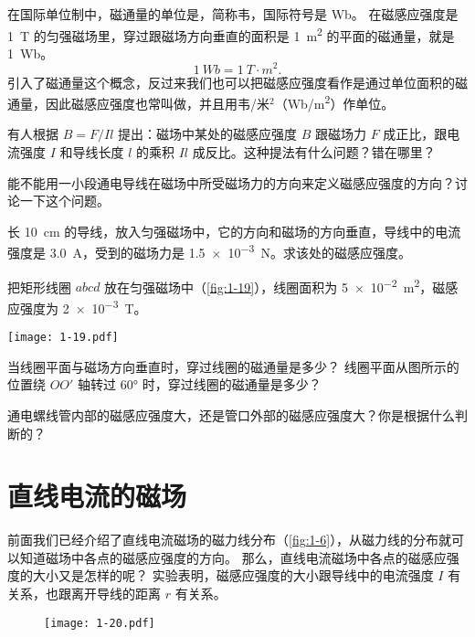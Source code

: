 在国际单位制中，磁通量的单位是，简称韦，国际符号是 \unit{Wb}。
在磁感应强度是 \qty{1}{T} 的匀强磁场里，穿过跟磁场方向垂直的面积是 \qty{1}{m^2} 的平面的磁通量，就是 \qty{1}{Wb}。
\[\qty{1}{Wb}=\qty{1}{T\cdot m^2}.\]
引入了磁通量这个概念，反过来我们也可以把磁感应强度看作是通过单位面积的磁通量，因此磁感应强度也常叫做，并且用韦/米$^2$（\unit{Wb/m^2}）作单位。

\begin{Practice}
\begin{question}
  \item 有人根据 $B=F/Il$ 提出：磁场中某处的磁感应强度 $B$ 跟磁场力 $F$ 成正比，跟电流强度 $I$ 和导线长度 $l$ 的乘积 $Il$ 成反比。这种提法有什么问题？错在哪里？
  \item 能不能用一小段通电导线在磁场中所受磁场力的方向来定义磁感应强度的方向？讨论一下这个问题。
  \item 长 \qty{10}{cm} 的导线，放入匀强磁场中，它的方向和磁场的方向垂直，导线中的电流强度是 \qty{3.0}{A}，受到的磁场力是 \qty{1.5e-3}{N}。求该处的磁感应强度。
  \item 把矩形线圈 $abcd$ 放在匀强磁场中（\cref{fig:1-19}），线圈面积为 \qty{5e-2}{m^2}，磁感应强度为 \qty{2e-3}{T}。
  \begin{figurehere}
    \begin{minipage}{\linewidth}\centering
      \texttt{[image: 1-19.pdf]}
      \caption{}\label{fig:1-19}
    \end{minipage}
  \end{figurehere}
  \begin{tasks}
    \task 当线圈平面与磁场方向垂直时，穿过线圈的磁通量是多少？
    \task 线圈平面从图所示的位置绕 $OO'$ 轴转过 \ang{60} 时，穿过线圈的磁通量是多少？
  \end{tasks}
  \item 通电螺线管内部的磁感应强度大，还是管口外部的磁感应强度大？你是根据什么判断的？
\end{question}
\end{Practice}

\section{直线电流的磁场}
前面我们已经介绍了直线电流磁场的磁力线分布（\cref{fig:1-6}），从磁力线的分布就可以知道磁场中各点的磁感应强度的方向。
那么，直线电流磁场中各点的磁感应强度的大小又是怎样的呢？
实验表明，磁感应强度的大小跟导线中的电流强度 $I$ 有关系，也跟离开导线的距离 $r$ 有关系。
\begin{figure}
  \texttt{[image: 1-20.pdf]}
	\caption{}\label{fig:1-20}
\end{figure}

